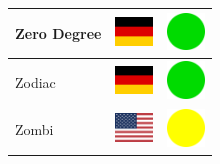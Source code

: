 \documentclass[12pt, a4paper, twoside]{report}
\begin{document}
\begin{center}
\begin{longtable}{|p{5cm}|p{2cm}|p{2cm}|}
Zero Degree & \includegraphics[width=1cm]{4x3/de} & \includegraphics[width=1cm]{likes/y} \\ \hline
Zodiac & \includegraphics[width=1cm]{4x3/de} & \includegraphics[width=1cm]{likes/y} \\ \hline
Zombi & \includegraphics[width=1cm]{4x3/us} & \includegraphics[width=1cm]{likes/m} \\ \hline
		\end{longtable}
	\end{center}
\end{document}
